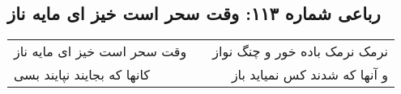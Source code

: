 \begin{center}
\section*{رباعی شماره ۱۱۳: وقت سحر است خیز ای مایه ناز}
\label{sec:sh113}
\begin{longtable}{l p{0.5cm} r}
وقت سحر است خیز ای مایه ناز
&&
نرمک نرمک باده خور و چنگ نواز
\\
کانها که بجایند نپایند بسی
&&
و آنها که شدند کس نمیاید باز
\\
\end{longtable}
\end{center}
